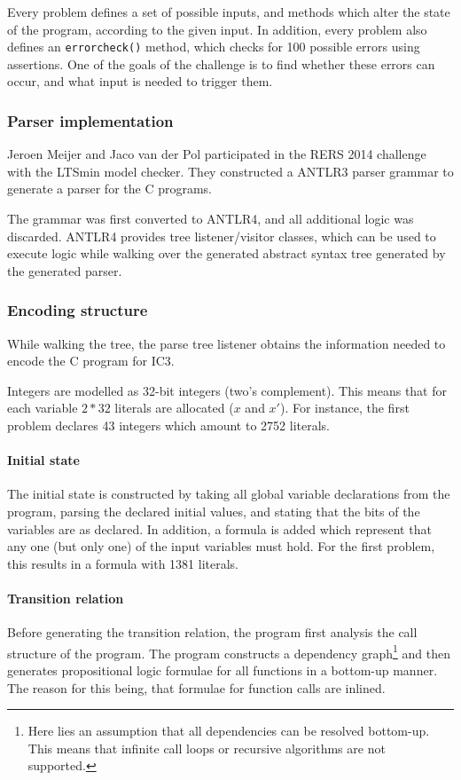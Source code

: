 \documentclass[a4paper]{article}
\begin{document}
Every problem defines a set of possible inputs, and methods which alter the state of the program, according to the given input.
In addition, every problem also defines an \texttt{errorcheck()} method, which checks for 100 possible errors using assertions. One of the goals of the challenge is to find whether these errors can occur, and what input is needed to trigger them.

\subsubsection{Parser implementation}
Jeroen Meijer and Jaco van der Pol participated in the RERS 2014 challenge with the LTSmin model checker.
They constructed a ANTLR3 parser grammar to generate a parser for the C programs.

The grammar was first converted to ANTLR4, and all additional logic was discarded.
ANTLR4 provides tree listener/visitor classes, which can be used to execute logic while walking over the generated abstract syntax tree generated by the generated parser.

\subsubsection{Encoding structure}
While walking the tree, the parse tree listener obtains the information needed to encode the C program for IC3.

Integers are modelled as 32-bit integers (two's complement). This means that for each variable $2*32$ literals are allocated ($x$ and $x'$). For instance, the first problem declares 43 integers which amount to 2752 literals.

\paragraph{Initial state}
The initial state is constructed by taking all global variable declarations from the program, parsing the declared initial values, and stating that the bits of the variables are as declared. In addition, a formula is added which represent that any one (but only one) of the input variables must hold. For the first problem, this results in a formula with 1381 literals.

\paragraph{Transition relation}
Before generating the transition relation, the program first analysis the call structure of the program. The program constructs a dependency graph\footnote{Here lies an assumption that all dependencies can be resolved bottom-up. This means that infinite call loops or recursive algorithms are not supported.} and then generates propositional logic formulae for all functions in a bottom-up manner. The reason for this being, that formulae for function calls are inlined.
\end{document}
